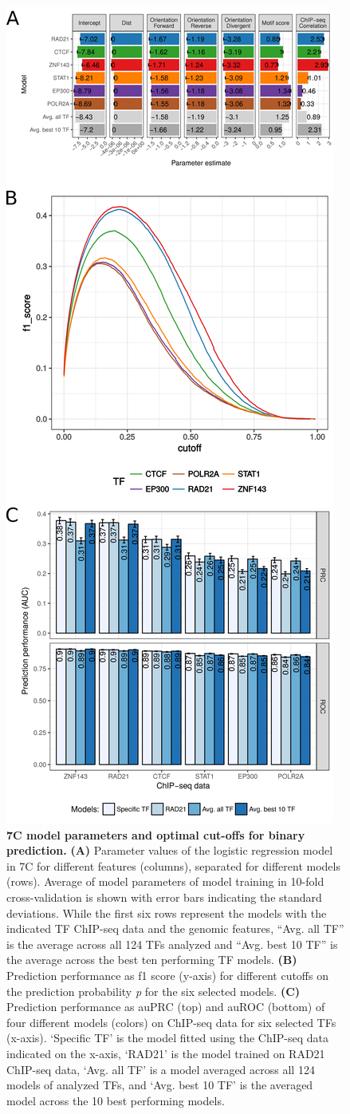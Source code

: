 \documentclass[a4paper,twoside=true,openright,parskip=full,chapterprefix=true,11pt,headings=normal,bibliography=totoc,listof=totoc,titlepage=on,captions=tableabove,draft=false]{scrreprt}
\theoremstyle{definition}
\theoremstyle{definition}
\theoremstyle{definition}
\theoremstyle{remark}
\begin{document}
\begin{figure}

{\centering \includegraphics[width=0.5\linewidth]{figures/loop_prediction/fig_S1_v02} 

}

\caption{\textbf{7C model parameters and optimal cut-offs for
binary prediction.} \textbf{(A)} Parameter values of the logistic
regression model in 7C for different features (columns), separated for
different models (rows). Average of model parameters of model training
in 10-fold cross-validation is shown with error bars indicating the
standard deviations. While the first six rows represent the models with
the indicated TF ChIP-seq data and the genomic features, ``Avg. all TF''
is the average across all 124 TFs analyzed and ``Avg. best 10 TF'' is
the average across the best ten performing TF models. \textbf{(B)}
Prediction performance as f1 score (y-axis) for different cutoffs on the
prediction probability \emph{p} for the six selected models.
\textbf{(C)} Prediction performance as auPRC (top) and auROC (bottom) of
four different models (colors) on ChIP-seq data for six selected TFs
(x-axis). `Specific TF' is the model fitted using the ChIP-seq data
indicated on the x-axis, `RAD21' is the model trained on RAD21 ChIP-seq
data, `Avg. all TF' is a model averaged across all 124 models of
analyzed TFs, and `Avg. best 10 TF' is the averaged model across the 10
best performing models.}\label{fig:LoopPredS1}
\end{figure}
\end{document}
